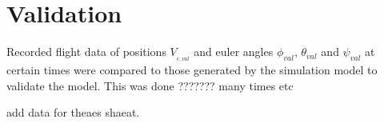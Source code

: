 \section{Validation}

Recorded flight data of positions \textbf{$V__{e,val}$} and euler angles $\phi_{val}$, $\theta_{val}$ and $\psi_{val}$ at certain times were compared to those generated by the simulation model to validate the model. This was done ??????? many times etc

add data for theaes shaeat.
